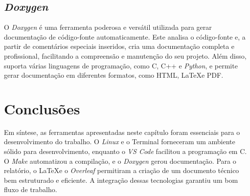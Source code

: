 \subsection{\textit{Doxygen}}
\label{chap3:subsec:doxygen}
O \textit{Doxygen} é uma ferramenta poderosa e versátil utilizada para gerar documentação de código-fonte automaticamente. Este analisa o código-fonte e, a partir de comentários especiais inseridos, cria uma documentação completa e profissional, facilitando a compreensão e manutenção do seu projeto. Além disso, suporta várias linguagens de programação, como C, C++ e \textit{Python}, e permite gerar documentação em diferentes formatos, como HTML, \LaTeX e PDF.


\section{Conclusões}
\label{chap3:sec:concs}
Em síntese, as ferramentas apresentadas neste capítulo foram essenciais para o desenvolvimento do trabalho. O \textit{Linux} e o Terminal forneceram um ambiente sólido para desenvolvimento, enquanto o \textit{\ac{VS Code}} facilitou a programação em C. O \textit{Make} automatizou a compilação, e o \textit{Doxygen} gerou documentação. Para o relatório, o \LaTeX e o \textit{Overleaf} permitiram a criação de um documento técnico bem estruturado e eficiente. A integração dessas tecnologias garantiu um bom fluxo de trabalho.